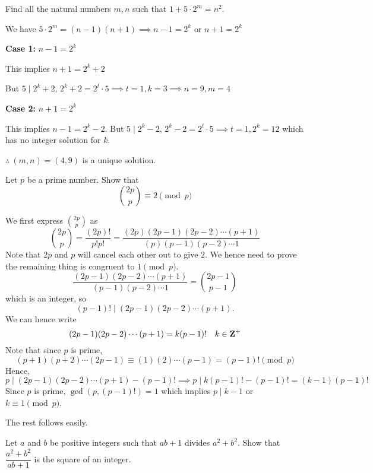 \begin{prbm}[Albania 2009]
Find all the natural numbers $m,n$ such that $1+5 \cdot 2^m=n^2$.
\end{prbm}

\begin{solution}
We have $5\cdot 2^m=(n-1)(n+1) \implies n-1=2^k \text{ or } n+1=2^k$

\textbf{Case 1:} $n-1=2^k$

This implies $n+1=2^k+2$

But $5\mid2^k+2$, $2^k+2=2^t\cdot 5 \implies t=1, k=3 \implies n=9,m=4$

\textbf{Case 2:} $n+1=2^k$ 

This implies $n-1=2^k-2$. 
But $5\mid2^k-2$, $2^k-2=2^t\cdot 5 \implies t=1,2^k=12$ which has no integer solution for $k$.

$\therefore\:(m,n)=(4,9)$ is a unique solution.
\end{solution}

\begin{prbm}
Let $p$ be a prime number. Show that 
\[\binom{2p}{p} \equiv 2 \pmod p\]
\end{prbm}

\begin{solution}
We first express $\binom{2p}{p}$ as
\[\binom{2p}{p} = \frac{(2p)!}{p!p!} = \frac{(2p)(2p-1)(2p-2)\cdots(p+1)}{(p)(p-1)(p-2)\cdots1}\]
Note that $2p$ and $p$ will cancel each other out to give 2. We hence need to prove the remaining thing is congruent to $1 \pmod p$.
\[\frac{(2p-1)(2p-2)\cdots(p+1)}{(p-1)(p-2)\cdots1} = \binom{2p-1}{p-1}\]
which is an integer, so 
\[(p-1)!\mid(2p-1)(2p-2)\cdots(p+1).\]
We can hence write
\[(2p-1)(2p-2)\cdots(p+1)=k(p-1)! \quad k\in\mathbf Z^+\]
Note that since $p$ is prime, 
\[(p+1)(p+2)\cdots(2p-1) \equiv (1)(2)\cdots(p-1) = (p-1)! \pmod p\]
Hence, 
\[p\mid (2p-1)(2p-2)\cdots(p+1)-(p-1)! \implies p\mid k(p-1)!-(p-1)!=(k-1)(p-1)!\]
Since $p$ is prime, $\gcd(p,(p-1)!)=1$ which implies $p\mid k-1$ or $k \equiv 1 \pmod p$.

The rest follows easily.
\end{solution}

\begin{prbm}
Let $a$ and $b$ be positive integers such that $ab+1$ divides $a^2+b^2$. Show that $\dfrac{a^2+b^2}{ab+1}$ is the square of an integer.
\end{prbm}


